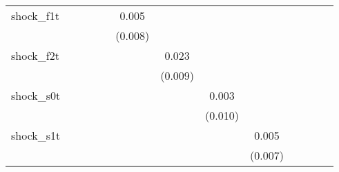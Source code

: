 {\begin{tabular}{l*{12}{c}}
\addlinespace
shock\_f1t   &                     &                     &                     &                     &       0.005         &                     &                     &                     &                     &                     &                     &                     \\
            &                     &                     &                     &                     &     (0.008)         &                     &                     &                     &                     &                     &                     &                     \\
\addlinespace
shock\_f2t   &                     &                     &                     &                     &                     &       0.023\sym{**} &                     &                     &                     &                     &                     &                     \\
            &                     &                     &                     &                     &                     &     (0.009)         &                     &                     &                     &                     &                     &                     \\
\addlinespace
shock\_s0t   &                     &                     &                     &                     &                     &                     &       0.003         &                     &                     &                     &                     &                     \\
            &                     &                     &                     &                     &                     &                     &     (0.010)         &                     &                     &                     &                     &                     \\
\addlinespace
shock\_s1t   &                     &                     &                     &                     &                     &                     &                     &       0.005         &                     &                     &                     &                     \\
            &                     &                     &                     &                     &                     &                     &                     &     (0.007)         &                     &                     &                     &                     \\

\end{tabular}}
